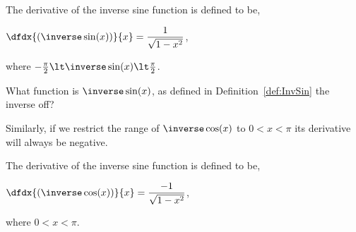 \begin{mydefinition}
  \label{def:InvSin}
 The derivative of the inverse sine function is defined to be,\\
 \centerline{$\displaystyle\dfdx{(\inverse\sin(x))}{x}=\frac{1}{\sqrt{1-x^2}}$,}
 where $-\frac{\pi}{2}\lt \inverse\sin(x)\lt \frac{\pi}{2}$.
\end{mydefinition}

\begin{embeddedproblem}
  What function is $\inverse\sin(x)$, as defined in
  Definition~\ref{def:InvSin} the inverse off?\\
\end{embeddedproblem}

Similarly, if we restrict the range of $\inverse\cos(x)$ to $0\lt x
\lt\pi$ its derivative will always be negative.

\begin{mydefinition}
  \label{def:InvCos}
 The derivative of the inverse sine function is defined to be,\\
 \centerline{$\displaystyle\dfdx{(\inverse\cos(x))}{x}=\frac{-1}{\sqrt{1-x^2}}$,} where $0\lt x\lt \pi$.
\end{mydefinition}


  
